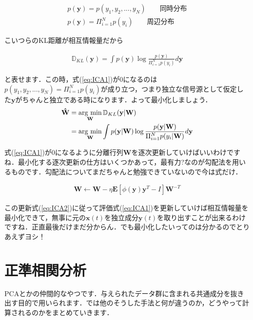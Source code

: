 \documentclass[11pt,a4paper]{ujreport}
\newcommand{\argmin}{\mathop{\rm arg~min}\limits}
\begin{document}
\begin{eqnarray}
p (\mathbf{y}) = p(y_1, y_2,...,y_N) \qquad \text{同時分布}\\
p (\mathbf{y}) = \Pi_{i=1}^N p(y_i) \qquad \text{周辺分布}
\end{eqnarray}

こいつらのKL距離が相互情報量だから

\begin{eqnarray}
\label{eq:ICA1}
\mathbb{D}_{KL}(\mathbf{y}) = \int p(\mathbf{y}) \log \frac{p(\mathbf{y})}{\Pi_{i=1}^N p(y_i)} d\mathbf{y}
\end{eqnarray}

と表せます．この時，式(\ref{eq:ICA1})が0になるのは$p(y_1, y_2,...,y_N) =\Pi_{i=1}^N p(y_i) $が成り立つ，つまり独立な信号源として仮定した$\mathbf{y}$がちゃんと独立である時になります．よって最小化しましょう．\\

\begin{align}
\label{eq:ICA2}
\mathbf{\hat W} &= \argmin_{\mathbf{W}} \mathbb{D}_{KL}(\mathbf{y}|\mathbf{W}) \nonumber \\
&= \argmin_{\mathbf{W}} \int p(\mathbf{y}|\mathbf{W}) \log \frac{p(\mathbf{y}|\mathbf{W})}{\Pi_{i=1}^N p(y_i|\mathbf{W})} d\mathbf{y}
\end{align}

式(\ref{eq:ICA1})が0になるように分離行列$\mathbf{W}$を逐次更新していけばいいわけですね．最小化する逐次更新の仕方はいくつかあって，最有力?なのが勾配法を用いるものです．勾配法についてまだちゃんと勉強できていないので今は式だけ．

\begin{eqnarray}
\label{eq:ICA3}
\mathbf{W} \leftarrow \mathbf{W} - \eta \mathbf{E}[\phi (\mathbf{y})\mathbf{y}^T - I]\mathbf{W}^{-T}
\end{eqnarray}

この更新式(\ref{eq:ICA2})に従って評価式(\ref{eq:ICA1})を更新していけば相互情報量を最小化できて，無事に元の$\mathbf{x}(t)$を独立成分$\mathbf{y}(t)$を取り出すことが出来るわけですね．正直最後だけまだ分からん．でも最小化したいってのは分かるのでとりあえずヨシ！

\section{正準相関分析}
PCAとかの仲間的なやつです．与えられたデータ群に含まれる共通成分を抜き出す目的で用いられます．では他のそうした手法と何が違うのか，どうやって計算されるのかをまとめていきます．\\
\end{document}
